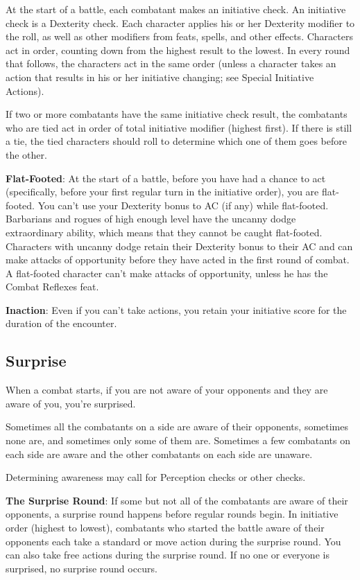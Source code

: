 				
At the start of a battle, each combatant makes an initiative check. An initiative check is a Dexterity check. Each character applies his or her Dexterity modifier to the roll, as well as other modifiers from feats, spells, and other effects. Characters act in order, counting down from the highest result to the lowest. In every round that follows, the characters act in the same order (unless a character takes an action that results in his or her initiative changing; see Special Initiative Actions).
				
If two or more combatants have the same initiative check result, the combatants who are tied act in order of total initiative modifier (highest first). If there is still a tie, the tied characters should roll to determine which one of them goes before the other.
				
\textbf{Flat-Footed}: At the start of a battle, before you have had a chance to act (specifically, before your first regular turn in the initiative order), you are flat-footed. You can't use your Dexterity bonus to AC (if any) while flat-footed. Barbarians and rogues of high enough level have the uncanny dodge extraordinary ability, which means that they cannot be caught flat-footed. Characters with uncanny dodge retain their Dexterity bonus to their AC and can make attacks of opportunity before they have acted in the first round of combat. A flat-footed character can't make attacks of opportunity, unless he has the Combat Reflexes feat.
				
\textbf{Inaction}: Even if you can't take actions, you retain your initiative score for the duration of the encounter.
				
\subsection{Surprise}

				
When a combat starts, if you are not aware of your opponents and they are aware of you, you're surprised.
				
Sometimes all the combatants on a side are aware of their opponents, sometimes none are, and sometimes only some of them are. Sometimes a few combatants on each side are aware and the other combatants on each side are unaware.
				
Determining awareness may call for Perception checks or other checks.
				
\textbf{The Surprise Round}: If some but not all of the combatants are aware of their opponents, a surprise round happens before regular rounds begin. In initiative order (highest to lowest), combatants who started the battle aware of their opponents each take a standard or move action during the surprise round. You can also take free actions during the surprise round. If no one or everyone is surprised, no surprise round occurs.
				
